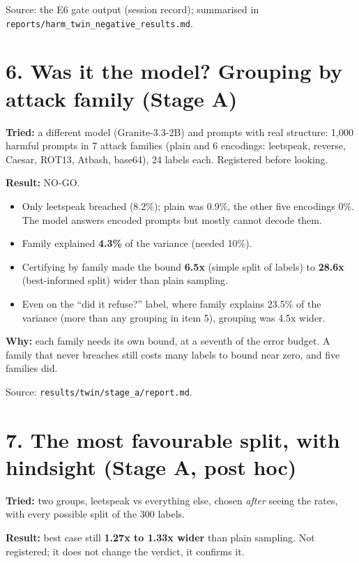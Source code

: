 \documentclass[11pt]{article}
\begin{document}
Source: the E6 gate output (session record); summarised in \texttt{reports/\allowbreak harm\_\allowbreak twin\_\allowbreak negative\_\allowbreak results.md}.


\section*{6. Was it the model? Grouping by attack family (Stage A)}

\textbf{Tried:} a different model (Granite-3.3-2B) and prompts with real structure: 1,000 harmful prompts in 7 attack families (plain and 6 encodings: leetspeak, reverse, Caesar, ROT13, Atbash, base64), 24 labels each. Registered before looking.


\textbf{Result:} NO-GO.


\begin{itemize}
\item Only leetspeak breached (8.2\%); plain was 0.9\%, the other five encodings 0\%. The model answers encoded prompts but mostly cannot decode them.
\item Family explained \textbf{4.3\%} of the variance (needed 10\%).
\item Certifying by family made the bound \textbf{6.5x} (simple split of labels) to \textbf{28.6x} (best-informed split) wider than plain sampling.
\item Even on the ``did it refuse?'' label, where family explains 23.5\% of the variance (more than any grouping in item 5), grouping was 4.5x wider.
\end{itemize}

\textbf{Why:} each family needs its own bound, at a seventh of the error budget. A family that never breaches still costs many labels to bound near zero, and five families did.


Source: \texttt{results/\allowbreak twin/\allowbreak stage\_\allowbreak a/\allowbreak report.md}.


\section*{7. The most favourable split, with hindsight (Stage A, post hoc)}

\textbf{Tried:} two groups, leetspeak vs everything else, chosen \emph{after} seeing the rates, with every possible split of the 300 labels.


\textbf{Result:} best case still \textbf{1.27x to 1.33x wider} than plain sampling. Not registered; it does not change the verdict, it confirms it.
\end{document}
